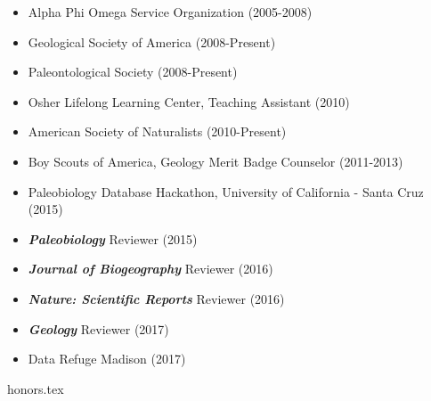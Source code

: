 \documentclass[12pt, a4paper]{awesome-cv}
\newcommand*{\sectiondir}{resume/}
\begin{document}
\fontsize{10pt}{1em}\bodyfontlight\upshape\color{text}
\begin{itemize}[leftmargin=*]
\item{Alpha Phi Omega Service Organization (2005-2008)}
\item{Geological Society of America (2008-Present)}
\item{Paleontological Society (2008-Present)}
\item{Osher Lifelong Learning Center, Teaching Assistant (2010)}
\item{American Society of Naturalists (2010-Present)}
\item{Boy Scouts of America, Geology Merit Badge Counselor (2011-2013)}
\item{Paleobiology Database Hackathon, University of California - Santa Cruz (2015)}
\item{\textbf{\textit{Paleobiology}} Reviewer (2015)}
\item{\textbf{\textit{Journal of Biogeography}} Reviewer (2016)}
\item{\textbf{\textit{Nature: Scientific Reports}} Reviewer (2016)}
\item{\textbf{\textit{Geology}} Reviewer (2017)}
\item{Data Refuge Madison (2017)}
\end{itemize}

{honors.tex}
\end{document}
